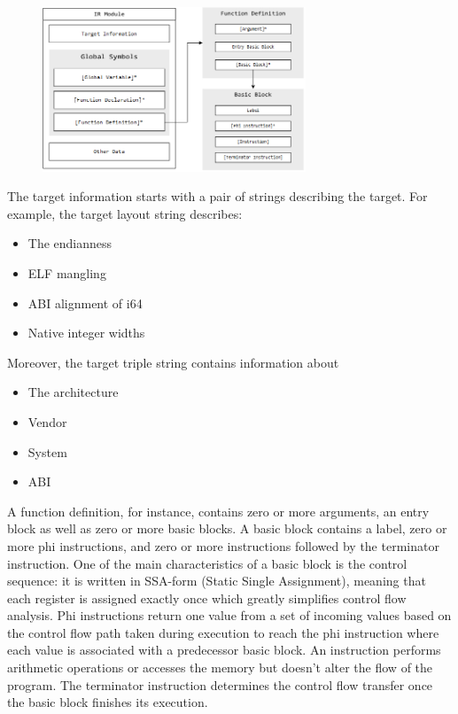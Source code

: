 \begin{figure}[ht]
    \centering
    \includegraphics[width=0.7\textwidth]{images/LLVMIR.png}
\end{figure}

The target information starts with a pair of strings describing the target. For
example, the target layout string describes:

\begin{itemize}
    \item The endianness
    \item ELF mangling
    \item ABI alignment of i64
    \item Native integer widths
\end{itemize}

Moreover, the target triple string contains information about 

\begin{itemize}
    \item The architecture
    \item Vendor
    \item System
    \item ABI
\end{itemize}

A function definition, for instance, contains zero or more arguments, an entry
block as well as zero or more basic blocks. A basic block contains a label, zero
or more phi instructions, and zero or more instructions followed by the terminator
instruction. One of the main characteristics of a basic block is the control sequence:
it is written in SSA-form (Static Single Assignment), meaning that each register
is assigned exactly once which greatly simplifies control flow analysis. Phi
instructions return one value from a set of incoming values based on the control
flow path taken during execution to reach the phi instruction where each value is
associated with a predecessor basic block. An instruction performs arithmetic
operations or accesses the memory but doesn't alter the flow of the program. The
terminator instruction determines the control flow transfer once the basic block
finishes its execution. 
